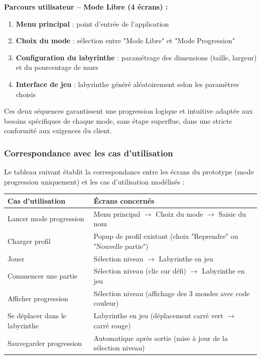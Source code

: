 \documentclass{butexFR}
\begin{document}
\textbf{Parcours utilisateur -- Mode Libre (4 écrans) :}

\begin{enumerate}
    \item \textbf{Menu principal} : point d'entrée de l'application
    \item \textbf{Choix du mode} : sélection entre "Mode Libre" et "Mode Progression"
    \item \textbf{Configuration du labyrinthe} : paramétrage des dimensions (taille, largeur) et du pourcentage de murs
    \item \textbf{Interface de jeu} : labyrinthe généré aléatoirement selon les paramètres choisis
\end{enumerate}

Ces deux séquences garantissent une progression logique et intuitive adaptée aux besoins spécifiques de chaque mode, sans étape superflue, dans une stricte conformité aux exigences du client.

\subsubsection{Correspondance avec les cas d'utilisation}

Le tableau suivant établit la correspondance entre les écrans du prototype (mode progression uniquement) et les cas d'utilisation modélisés :

\vspace{1em}
\begin{center}
\begin{tabular}{|p{5cm}|p{8cm}|}
\hline
\textbf{Cas d'utilisation} & \textbf{Écrans concernés} \\
\hline
Lancer mode progression & Menu principal $\rightarrow$ Choix du mode $\rightarrow$ Saisie du nom \\
\hline
Charger profil & Popup de profil existant (choix "Reprendre" ou "Nouvelle partie") \\
\hline
Jouer & Sélection niveau $\rightarrow$ Labyrinthe en jeu \\
\hline
Commencer une partie & Sélection niveau (clic sur défi) $\rightarrow$ Labyrinthe en jeu \\
\hline
Afficher progression & Sélection niveau (affichage des 3 mondes avec code couleur) \\
\hline
Se déplacer dans le labyrinthe & Labyrinthe en jeu (déplacement carré vert $\rightarrow$ carré rouge) \\
\hline
Sauvegarder progression & Automatique après sortie (mise à jour de la sélection niveau) \\
\hline
\end{tabular}
\end{center}
\vspace{1em}
\end{document}
